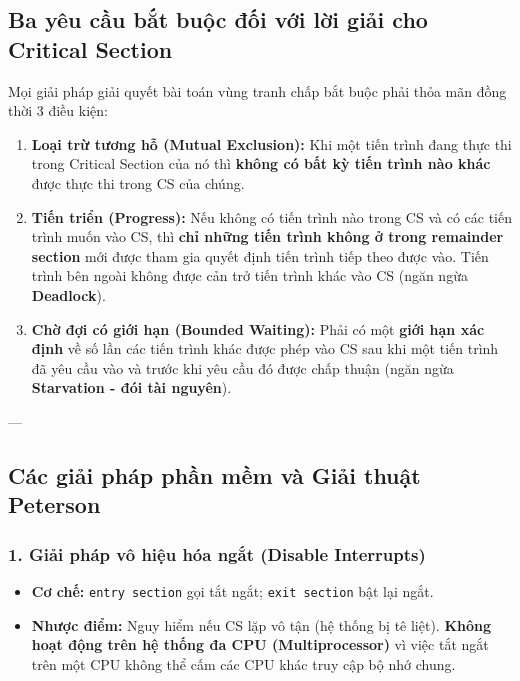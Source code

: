 \documentclass[11pt,a4paper]{article}
\begin{document}
\subsection{Ba yêu cầu bắt buộc đối với lời giải cho Critical Section}
\begin{importantbox}
Mọi giải pháp giải quyết bài toán vùng tranh chấp bắt buộc phải thỏa mãn đồng thời 3 điều kiện:
\begin{enumerate}
    \item \textbf{Loại trừ tương hỗ (Mutual Exclusion):} Khi một tiến trình đang thực thi trong Critical Section của nó thì \textbf{không có bất kỳ tiến trình nào khác} được thực thi trong CS của chúng.
    \item \textbf{Tiến triển (Progress):} Nếu không có tiến trình nào trong CS và có các tiến trình muốn vào CS, thì \textbf{chỉ những tiến trình không ở trong remainder section} mới được tham gia quyết định tiến trình tiếp theo được vào. Tiến trình bên ngoài không được cản trở tiến trình khác vào CS (ngăn ngừa \textbf{Deadlock}).
    \item \textbf{Chờ đợi có giới hạn (Bounded Waiting):} Phải có một \textbf{giới hạn xác định} về số lần các tiến trình khác được phép vào CS sau khi một tiến trình đã yêu cầu vào và trước khi yêu cầu đó được chấp thuận (ngăn ngừa \textbf{Starvation - đói tài nguyên}).
\end{enumerate}
\end{importantbox}

---

\subsection{Các giải pháp phần mềm và Giải thuật Peterson}

\subsubsection{1. Giải pháp vô hiệu hóa ngắt (Disable Interrupts)}
\begin{itemize}[noitemsep]
    \item \textbf{Cơ chế:} \texttt{entry section} gọi tắt ngắt; \texttt{exit section} bật lại ngắt.
    \item \textbf{Nhược điểm:} Nguy hiểm nếu CS lặp vô tận (hệ thống bị tê liệt). \textbf{Không hoạt động trên hệ thống đa CPU (Multiprocessor)} vì việc tắt ngắt trên một CPU không thể cấm các CPU khác truy cập bộ nhớ chung.
\end{itemize}
\end{document}
